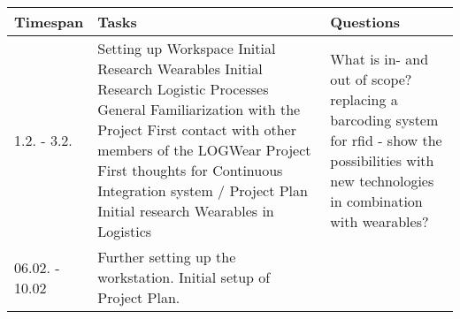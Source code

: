\documentclass{article}
\begin{document}
\begin{table}[htbp]
	\begin{center}
		\begin{tabular}{|p{0.15\linewidth}|p{0.55\linewidth}|p{0.3\linewidth}|} \hline
			\textbf{Timespan} & \textbf{Tasks} & \textbf{Questions} \\ \hline
            1.2. - 3.2. & 	Setting up Workspace \newline 
            				Initial Research Wearables \newline
            				Initial Research Logistic Processes \newline
            				General Familiarization with the Project \newline 
            				First contact with other members of the LOGWear Project \newline
            				First thoughts for Continuous Integration system / Project Plan \newline
            				Initial research Wearables in Logistics &
            				What is in- and out of scope? \newline
            				replacing a barcoding system for rfid - show the possibilities with new technologies in combination with wearables? \\ \hline
            				06.02. - 10.02 & Further setting up the workstation. \newline
            				Initial setup of Project Plan. \newline
            				 & \\ \hline
		\end{tabular}	
    \end{center}
\end{table}
\end{document}
